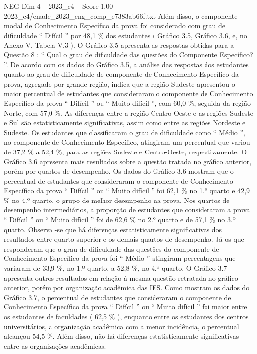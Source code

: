 \begin{textsample}{NEG Dim 4 – 2023\_c4 – Score 1.00 – 2023\_c4/enade\_2023\_eng\_comp\_e7383ab66f.txt}
Além disso, o componente modal de Conhecimento Específico da prova foi considerado com grau de dificuldade “ Difícil ” por 48,1 \% dos estudantes ( Gráfico 3.5, Gráfico 3.6, e, no Anexo V, Tabela V.3 ).
O Gráfico 3.5 apresenta as respostas obtidas para a Questão 8 : “ Qual o grau de dificuldade das questões do Componente Específico? ”.
De acordo com os dados do Gráfico 3.5, a análise das respostas dos estudantes quanto ao grau de dificuldade do componente de Conhecimento Específico da prova, agregado por grande região, indica que a região Sudeste apresentou o maior percentual de estudantes que consideraram o componente de Conhecimento Específico da prova “ Difícil ” ou “ Muito difícil ”, com 60,0 \%, seguida da região Norte, com 57,0 \%.
As diferenças entre a região Centro-Oeste e as regiões Sudeste e Sul são estatisticamente significativas, assim como entre as regiões Nordeste e Sudeste.
Os estudantes que classificaram o grau de dificuldade como “ Médio ”, no componente de Conhecimento Específico, atingiram um percentual que variou de 37,2 \% a 52,4 \%, para as regiões Sudeste e Centro-Oeste, respectivamente.
O Gráfico 3.6 apresenta mais resultados sobre a questão tratada no gráfico anterior, porém por quartos de desempenho.
Os dados do Gráfico 3.6 mostram que o percentual de estudantes que consideraram o componente de Conhecimento Específico da prova “ Difícil ” ou “ Muito difícil ” foi 62,1 \% no 1.º quarto e 42,9 \% no 4.º quarto, o grupo de melhor desempenho na prova.
Nos quartos de desempenho intermediários, a proporção de estudantes que consideraram a prova “ Difícil ” ou “ Muito difícil ” foi de 62,6 \% no 2.º quarto e de 57,1 \% no 3.º quarto.
Observa -se que há diferenças estatisticamente significativas dos resultados entre quarto superior e os demais quartos de desempenho.
Já os que responderam que o grau de dificuldade das questões do componente de Conhecimento Específico da prova foi “ Médio ” atingiram percentagens que variaram de 33,9 \%, no 1.º quarto, a 52,8 \%, no 4.º quarto.
O Gráfico 3.7 apresenta outros resultados em relação à mesma questão retratada no gráfico anterior, porém por organização acadêmica das IES.
Como mostram os dados do Gráfico 3.7, o percentual de estudantes que consideraram o componente de Conhecimento Específico da prova “ Difícil ” ou “ Muito difícil ” foi maior entre os estudantes de faculdades ( 62,5 \% ), enquanto entre os estudantes dos centros universitários, a organização acadêmica com a menor incidência, o percentual alcançou 54,5 \%.
Além disso, não há diferenças estatisticamente significativas entre as organizações acadêmicas.

\end{textsample}
